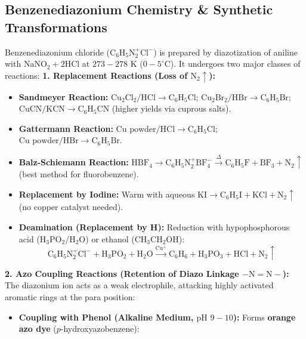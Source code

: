 \documentclass[10pt,twoside,openright]{book}
\begin{document}
\subsection{Benzenediazonium Chemistry \& Synthetic Transformations}

\begin{formulabox}
Benzenediazonium chloride ($\mathrm{C_6H_5N_2^+Cl^-}$) is prepared by diazotization of aniline with $\mathrm{NaNO_2 + 2HCl}$ at $273-278\text{ K}$ ($0-5^\circ\text{C}$). It undergoes two major classes of reactions:
\textbf{1. Replacement Reactions (Loss of $\mathrm{N_2}\uparrow$):}
\begin{itemize}
  \item \textbf{Sandmeyer Reaction:} $\mathrm{Cu_2Cl_2/HCl} \to \mathrm{C_6H_5Cl}$; $\mathrm{Cu_2Br_2/HBr} \to \mathrm{C_6H_5Br}$; $\mathrm{CuCN/KCN} \to \mathrm{C_6H_5CN}$ (higher yields via cuprous salts).
  \item \textbf{Gattermann Reaction:} $\mathrm{Cu \text{ powder} / HCl} \to \mathrm{C_6H_5Cl}$; $\mathrm{Cu \text{ powder} / HBr} \to \mathrm{C_6H_5Br}$.
  \item \textbf{Balz-Schiemann Reaction:} $\mathrm{HBF_4} \to \mathrm{C_6H_5N_2^+BF_4^-} \xrightarrow{\Delta} \mathbf{\mathrm{C_6H_5F}} + \mathrm{BF_3} + \mathrm{N_2}\uparrow$ (best method for fluorobenzene).
  \item \textbf{Replacement by Iodine:} Warm with aqueous $\mathrm{KI} \to \mathbf{\mathrm{C_6H_5I}} + \mathrm{KCl} + \mathrm{N_2}\uparrow$ (no copper catalyst needed).
  \item \textbf{Deamination (Replacement by H):} Reduction with hypophosphorous acid ($\mathrm{H_3PO_2 / H_2O}$) or ethanol ($\mathrm{CH_3CH_2OH}$):
  \begin{equation}
    \mathrm{C_6H_5N_2^+Cl^-} + \mathrm{H_3PO_2} + \mathrm{H_2O} \xrightarrow{\mathrm{Cu^+}} \mathbf{\mathrm{C_6H_6}} + \mathrm{H_3PO_3} + \mathrm{HCl} + \mathrm{N_2}\uparrow
  \end{equation}
\end{itemize}
\textbf{2. Azo Coupling Reactions (Retention of Diazo Linkage $-\mathrm{N=N}-$):}
The diazonium ion acts as a weak electrophile, attacking highly activated aromatic rings at the para position:
\begin{itemize}
  \item \textbf{Coupling with Phenol (Alkaline Medium, $\text{pH } 9-10$):} Forms \textbf{orange azo dye} ($p$-hydroxyazobenzene):
  \begin{align}

\end{align}
\end{itemize}
\end{formulabox}
\end{document}
